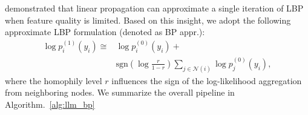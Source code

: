


\cite{wei2022understanding} demonstrated that linear propagation can approximate a single iteration of LBP when feature quality is limited. Based on this insight, we adopt the following approximate LBP formulation (denoted as BP appr.):
\begin{align}
 \log p_i^{(1)}(y_i) \cong &\log p_i^{(0)}(y_i)+
 \label{eq:bp_appr}\\
 &\text{sgn}(\log \frac{r}{1-r})\sum_{j \in \mathcal{N}(i)} \log p_j^{(0)}(y_i),  \nonumber    
\end{align}
where the homophily level $r$ influences the sign of the log-likelihood aggregation from neighboring nodes. We summarize the overall pipeline in Algorithm.~\ref{alg:llm_bp}

